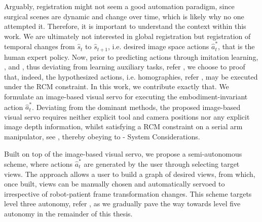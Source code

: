 Arguably, registration might not seem a good automation paradigm, since surgical scenes are dynamic and change over time, which is likely why no one attempted it. Therefore, it is important to understand the context within this work. We are ultimately not interested in global registration but registration of temporal changes from $\hat{s}_t$ to $\hat{s}_{t+1}$, i.e. desired image space actions $\hat{a}^*_t$, that is the human expert policy. Now, prior to predicting actions through imitation learning, , and , thus deviating from learning auxiliary tasks, refer , we choose to proof that, indeed, the hypothesized actions, i.e. homographies, refer , may be executed under the RCM constraint. In this work, we contribute exactly that. We formulate an image-based visual servo for executing the embodiment-invariant action $\hat{a}^*_t$. Deviating from the dominant methods, the proposed image-based visual servo requires neither explicit tool and camera positions nor any explicit image depth information, whilst satisfying a RCM constraint on a serial arm manipulator, see , thereby obeying to  - System Considerations. 

Built on top of the image-based visual servo, we propose a semi-autonomous scheme, where actions $\hat{a}^*_t$ are generated by the user through selecting target views. The approach allows a user to build a graph of desired views, from which, once built, views can be manually chosen and automatically servoed to irrespective of robot-patient frame transformation changes. This scheme targets level three autonomy, refer , as we gradually pave the way towards level five autonomy in the remainder of this thesis.




